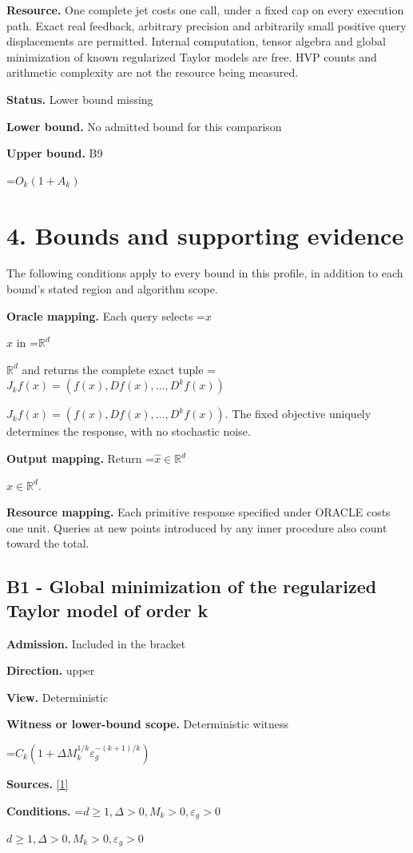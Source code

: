 \documentclass[10pt,a4paper]{article}
\newcommand{\AtlasMath}[1]{\par\begingroup\centering\setbox0=\hbox{$\displaystyle #1$}\ifdim\wd0>1.4\linewidth\typeout{ATLAS WIDE FORMULA: \the\wd0}\fi\ifdim\wd0>\linewidth\resizebox{\linewidth}{!}{\box0}\else\box0\fi\par\endgroup}
\newcommand{\AtlasInlineMath}[1]{\begingroup\setbox0=\hbox{$#1$}\ifdim\wd0>.4\linewidth\endgroup\AtlasMath{#1}\else\endgroup$#1$\fi}
\begin{document}
\textbf{Resource.} One complete jet costs one call, under a fixed cap on every execution path. Exact real feedback, arbitrary precision and arbitrarily small positive query displacements are permitted. Internal computation, tensor algebra and global minimization of known regularized Taylor models are free. HVP counts and arithmetic complexity are not the resource being measured.

\textbf{Status.} Lower bound missing

\textbf{Lower bound.} No admitted bound for this comparison

\textbf{Upper bound.} B9

\AtlasMath{O_k(1+A_k)}
\section{4. Bounds and supporting evidence}
The following conditions apply to every bound in this profile, in addition to each bound's stated region and algorithm scope.

\textbf{Oracle mapping.} Each query selects \AtlasInlineMath{x} in \AtlasInlineMath{\mathbb{R}^d} and returns the complete exact tuple \AtlasInlineMath{J_{k}f(x)=(f(x),Df(x),\ldots,D^{k}f(x))}. The fixed objective uniquely determines the response, with no stochastic noise.

\textbf{Output mapping.} Return \AtlasInlineMath{\widehat{x}\in \mathbb{R}^d}.

\textbf{Resource mapping.} Each primitive response specified under ORACLE costs one unit. Queries at new points introduced by any inner procedure also count toward the total.

\subsection{B1 - Global minimization of the regularized Taylor model of order k}
\textbf{Admission.} Included in the bracket

\textbf{Direction.} upper

\textbf{View.} Deterministic

\textbf{Witness or lower-bound scope.} Deterministic witness

\AtlasMath{C_k(1+\Delta M_k^{1/k}\varepsilon_g^{-(k+1)/k})}
\textbf{Sources.} \href{https://optimization-online.org/wp-content/uploads/2015/06/4970.pdf}{[1]}

\textbf{Conditions.} \AtlasInlineMath{d\ge 1, \Delta>0, M_k>0, \varepsilon_g>0}
\end{document}
